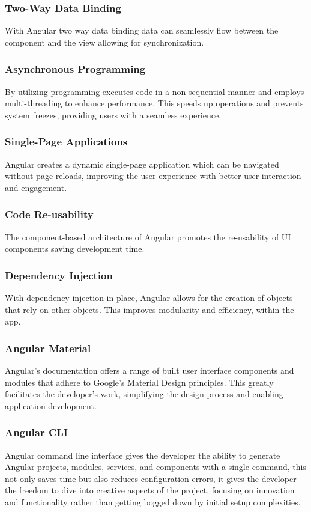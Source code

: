\subsubsection{Two-Way Data Binding}
With Angular two way data binding data can seamlessly flow between the component and the view allowing for synchronization.

\subsubsection{Asynchronous Programming}
By utilizing programming executes code in a non-sequential manner and employs multi-threading to enhance performance. This speeds up operations and prevents system freezes, providing users with a seamless experience.

\subsubsection{Single-Page Applications}
Angular creates a dynamic single-page application which can be navigated without page reloads, improving the user experience with better user interaction and engagement.

\subsubsection {Code Re-usability}
The component-based architecture of Angular promotes the re-usability of UI components saving development time.

\subsubsection{Dependency Injection}
With dependency injection in place, Angular allows for the creation of objects that rely on other objects. This improves modularity and efficiency, within the app.

\subsubsection{Angular Material}
Angular's documentation offers a range of built user interface components and modules that adhere to Google's Material Design principles. This greatly facilitates the developer's work, simplifying the design process and enabling application development.

\subsubsection{Angular CLI} Angular command line interface gives the developer the ability to generate Angular projects, modules, services, and components with a single command, this not only saves time but also reduces configuration errors, it gives the developer the freedom to dive into creative aspects of the project, focusing on innovation and functionality rather than getting bogged down by initial setup complexities.

